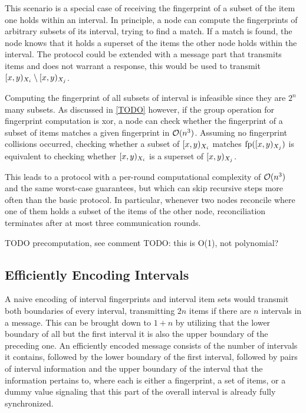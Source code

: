 This scenario is a special case of receiving the fingerprint of a subset of the item one holds within an interval. In principle, a node can compute the fingerprints of arbitrary subsets of its interval, trying to find a match. If a match is found, the node knows that it holds a superset of the items the other node holds within the interval. The protocol could be extended with a message part that transmits items and does not warrant a response, this would be used to transmit $[{x},{y})_{X_i} \setminus [{x},{y})_{X_j}$.

Computing the fingerprint of all subsets of interval is infeasible since they are $2^n$ many subsets. As discussed in \cref{TODO} however, if the group operation for fingerprint computation is xor, a node can check whether the fingerprint of a subset of items matches a given fingerprint in $\mathcal{O}(n^3)$.
Assuming no fingerprint collisions occurred, checking whether a subset of $[{x},{y})_{X_i}$ matches $\operatorname{fp}([{x},{y})_{X_j})$ is equivalent to checking whether $[{x},{y})_{X_i}$ is a superset of $[{x},{y})_{X_j}$.

This leads to a protocol with a per-round computational complexity of $\mathcal{O}(n^3)$ and the same worst-case guarantees, but which can skip recursive steps more often than the basic protocol. In particular, whenever two nodes reconcile where one of them holds a subset of the items of the other node, reconciliation terminates after at most three communication rounds.

TODO precomputation, see comment %
TODO: this is O(1), not polynomial?

\subsection{Efficiently Encoding Intervals}

A naive encoding of interval fingerprints and interval item sets would transmit both boundaries of every interval, transmitting $2n$ items if there are $n$ intervals in a message. This can be brought down to $1 + n$ by utilizing that the lower boundary of all but the first interval it is also the upper boundary of the preceding one. An efficiently encoded message consists of the number of intervals it contains, followed by the lower boundary of the first interval, followed by pairs of interval information and the upper boundary of the interval that the information pertains to, where each  is either a fingerprint, a set of items, or a dummy value signaling that this part of the overall interval is already fully synchronized.

